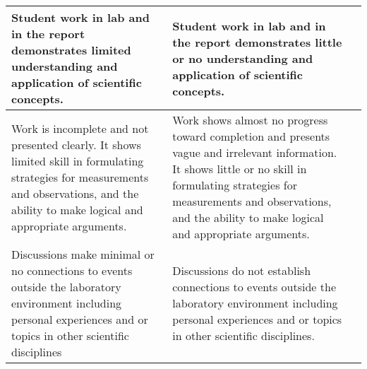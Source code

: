 \begin{table}[htbp]
\begin{tabular}{p{2in}p{2in}p{2in}}
Student work in lab and in the report demonstrates limited understanding and application of scientific concepts.
	&Student work in lab and in the report demonstrates little or no understanding and application of scientific concepts.\\
	\midrule
Work is incomplete and not presented clearly. It shows limited skill in formulating strategies for measurements and observations, and the ability to make logical and appropriate arguments.
	&Work shows almost no progress toward completion and presents vague and irrelevant information. It shows little or no skill in formulating strategies for measurements and observations, and the ability to make logical and appropriate arguments.\\
	\midrule
Discussions make minimal or no connections to events outside the laboratory environment including personal experiences and or topics in other scientific disciplines
	&Discussions do not establish connections to events outside the laboratory environment including personal experiences and or topics in other scientific disciplines.\\
	\bottomrule
\end{tabular}
\end{table}
 
\endinput
